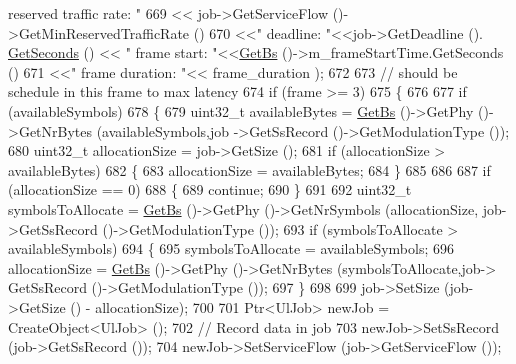 \begin{DoxyCode}
{       reserved traffic rate: "}
669                                   << job->GetServiceFlow ()->GetMinReservedTrafficRate ()
670                                   <<\textcolor{stringliteral}{" deadline: "}<<job->GetDeadline ().
      \hyperlink{classns3_1_1Time_a8f20d5c3b0902d7b4320982f340b57c8}{GetSeconds} () << \textcolor{stringliteral}{" frame start: "}<<\hyperlink{classns3_1_1UplinkScheduler_afe61b7de71d92d2dff1b135744a6ff7e}{GetBs} ()->m\_frameStartTime.GetSeconds ()
671                                   <<\textcolor{stringliteral}{" frame duration: "}<< frame\_duration );
672 
673               \textcolor{comment}{// should be schedule in this frame to max latency}
674               \textcolor{keywordflow}{if} (frame >= 3)
675                 \{
676 
677                   \textcolor{keywordflow}{if} (availableSymbols)
678                     \{
679                       uint32\_t availableBytes =  \hyperlink{classns3_1_1UplinkScheduler_afe61b7de71d92d2dff1b135744a6ff7e}{GetBs} ()->GetPhy ()->GetNrBytes (availableSymbols,job
      ->GetSsRecord ()->GetModulationType ());
680                       uint32\_t allocationSize = job->GetSize ();
681                       \textcolor{keywordflow}{if} (allocationSize > availableBytes)
682                         \{
683                           allocationSize = availableBytes;
684                         \}
685 
686 
687                       \textcolor{keywordflow}{if} (allocationSize == 0)
688                         \{
689                           \textcolor{keywordflow}{continue};
690                         \}
691 
692                       uint32\_t symbolsToAllocate = \hyperlink{classns3_1_1UplinkScheduler_afe61b7de71d92d2dff1b135744a6ff7e}{GetBs} ()->GetPhy ()->GetNrSymbols (allocationSize, 
      job->GetSsRecord ()->GetModulationType ());
693                       \textcolor{keywordflow}{if} (symbolsToAllocate > availableSymbols)
694                         \{
695                           symbolsToAllocate = availableSymbols;
696                           allocationSize = \hyperlink{classns3_1_1UplinkScheduler_afe61b7de71d92d2dff1b135744a6ff7e}{GetBs} ()->GetPhy ()->GetNrBytes (symbolsToAllocate,job->
      GetSsRecord ()->GetModulationType ());
697                         \}
698 
699                       job->SetSize (job->GetSize () - allocationSize);
700 
701                       Ptr<UlJob> newJob =  CreateObject<UlJob> ();
702                       \textcolor{comment}{// Record data in job}
703                       newJob->SetSsRecord (job->GetSsRecord ());
704                       newJob->SetServiceFlow (job->GetServiceFlow ());

\end{DoxyCode}
